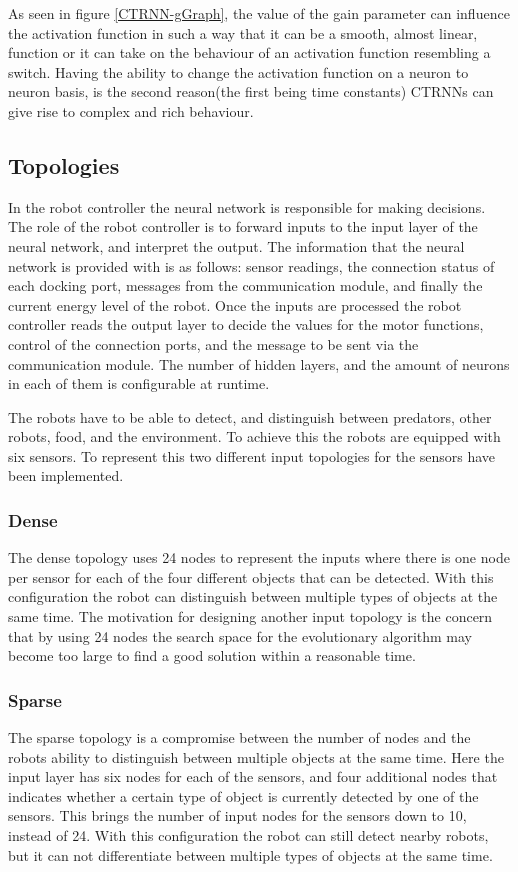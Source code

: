As seen in figure \ref{CTRNN-gGraph}, the value of the gain parameter can influence the activation function in such a way that it can be a smooth, almost linear, function or it can take on the behaviour of an activation function resembling a switch.
Having the ability to change the activation function on a neuron to neuron basis, is the second reason(the first being time constants) CTRNNs can give rise to complex and rich behaviour.


\subsection{Topologies}
In the robot controller the neural network is responsible for making decisions.
The role of the robot controller is to forward inputs to the input layer of the neural network, and interpret the output.
The information that the neural network is provided with is as follows: sensor readings, the connection status of each docking port, messages from the communication module, and finally the current energy level of the robot.
Once the inputs are processed the robot controller reads the output layer to decide the values for the motor functions, control of the connection ports, and the message to be sent via the communication module.
The number of hidden layers, and the amount of neurons in each of them is configurable at runtime.
	
The robots have to be able to detect, and distinguish between predators, other robots, food, and the environment.
To achieve this the robots are equipped with six sensors.
To represent this two different input topologies for the sensors have been implemented.

\subsubsection{Dense}
The dense topology uses 24 nodes to represent the inputs where there is one node per sensor for each of the four different objects that can be detected.
With this configuration the robot can distinguish between multiple types of objects at the same time.
The motivation for designing another input topology is the concern that by using 24 nodes the search space for the evolutionary algorithm may become too large to find a good solution within a reasonable time.
\subsubsection{Sparse}
The sparse topology is a compromise between the number of nodes and the robots ability to distinguish between multiple objects at the same time.
Here the input layer has six nodes for each of the sensors, and four additional nodes that indicates whether a certain type of object is currently detected by one of the sensors.
This brings the number of input nodes for the sensors down to 10, instead of 24.
With this configuration the robot can still detect nearby robots, but it can not differentiate between multiple types of objects at the same time.
			
